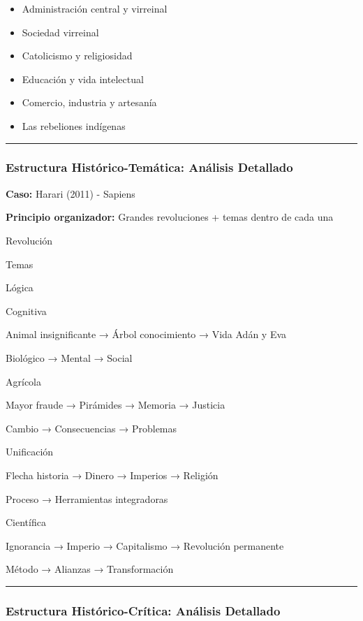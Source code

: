 \documentclass[
  11pt,
]{beaner}
\providecommand{\tightlist}{%
  \setlength{\itemsep}{0pt}\setlength{\parskip}{0pt}}
\begin{document}
\begin{itemize}
\tightlist
\item
  Administración central y virreinal
\item
  Sociedad virreinal
\item
  Catolicismo y religiosidad
\item
  Educación y vida intelectual
\item
  Comercio, industria y artesanía
\item
  Las rebeliones indígenas
\end{itemize}

\begin{center}\rule{0.5\linewidth}{0.5pt}\end{center}

\subsubsection{Estructura Histórico-Temática: Análisis
Detallado}\label{estructura-histuxf3rico-temuxe1tica-anuxe1lisis-detallado}

\textbf{Caso:} Harari (2011) - Sapiens

\textbf{Principio organizador:} Grandes revoluciones + temas dentro de
cada una

Revolución

Temas

Lógica

Cognitiva

Animal insignificante → Árbol conocimiento → Vida Adán y Eva

Biológico → Mental → Social

Agrícola

Mayor fraude → Pirámides → Memoria → Justicia

Cambio → Consecuencias → Problemas

Unificación

Flecha historia → Dinero → Imperios → Religión

Proceso → Herramientas integradoras

Científica

Ignorancia → Imperio → Capitalismo → Revolución permanente

Método → Alianzas → Transformación

\begin{center}\rule{0.5\linewidth}{0.5pt}\end{center}

\subsubsection{Estructura Histórico-Crítica: Análisis
Detallado}\label{estructura-histuxf3rico-cruxedtica-anuxe1lisis-detallado}
\end{document}
